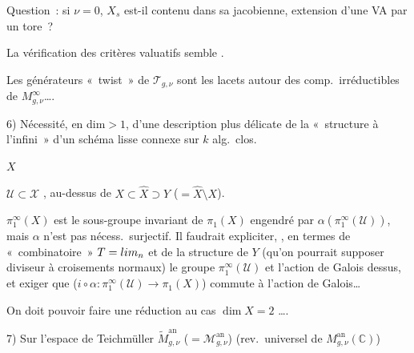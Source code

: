 \documentclass[11pt,a4paper]{article}
\begin{document}
\marginal{*} Question~: si $\nu=0$, $X_s$  est-il contenu
dans sa jacobienne, extension d'une VA par un tore~?

La vérification des critères valuatifs \marginal{*} semble
.

Les générateurs «~twist~» de $\mathcal{T}_{g,\nu}$ sont les lacets
autour des comp.\ irréductibles de $M^{\infty}_{g,\nu}$….

6) Nécessité, en dim${}>1$, d'une description plus délicate de la
«~structure à l'infini~» d'un schéma lisse connexe
 sur $k$ alg.\ clos.

$X$



$\mathcal{U}\subset\mathcal{X}$ , au-dessus de $X\subset\hat X\supset Y$
($=\hat X\setminus X$).

$\pi_1^{\infty}(X)$ est le sous-groupe  invariant de
$\pi_1(X)$ engendré par $\alpha(\pi_1^{\infty}(\mathcal{U}))$, mais
$\alpha$ n'est pas nécess.\ surjectif. Il faudrait expliciter,
, en termes de «~combinatoire~»
$T=\varprojlim_n$ \ill{} et de la structure de $Y$ (qu'on pourrait
supposer \add{\ill{}} diviseur à croisements normaux) le groupe
$\pi_1^{\infty}(\mathcal{U})$ et l'action de Galois dessus, et
 exiger que ($i\circ\alpha:
\pi_1^{\infty}(\mathcal{U})\to\pi_1(X)$) commute à l'action de Galois…

On doit pouvoir  faire une réduction au cas
$\dim X=2$ ….

7) Sur l'espace de Teichmüller 
$\widetilde{M}^{\mathrm{an}}_{g,\nu}$ ($=\mathcal{M}^{\mathrm{an}}_{g,\nu}$)
(rev.\ universel de  \add{\ill{}}
$M^{\mathrm{an}}_{g,\nu}(\mathbb{C})$)
\end{document}
